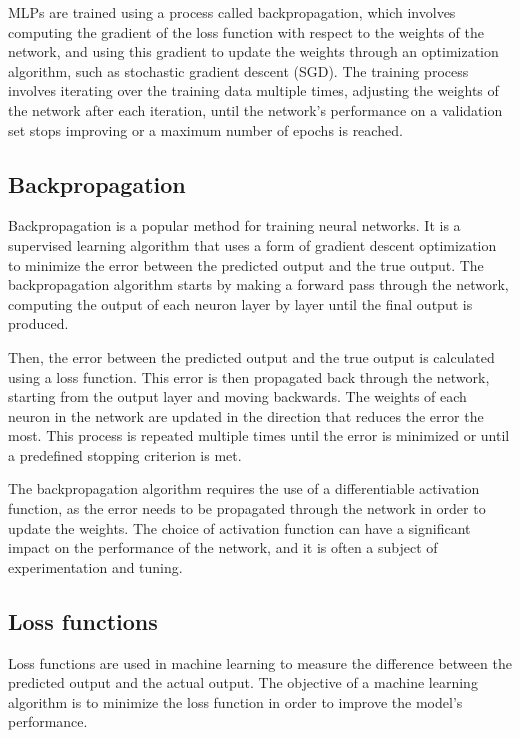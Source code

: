 MLPs are trained using a process called backpropagation, which involves computing the gradient of the loss function with respect to the weights of the network, and using this gradient to update the weights through an optimization algorithm, such as stochastic gradient descent (SGD). 
The training process involves iterating over the training data multiple times, adjusting the weights of the network after each iteration, until the network's performance on a validation set stops improving or a maximum number of epochs is reached.


\subsection{Backpropagation}

Backpropagation is a popular method for training neural networks.
It is a supervised learning algorithm that uses a form of gradient descent optimization to minimize the error between the predicted output and the true output.
The backpropagation algorithm starts by making a forward pass through the network, computing the output of each neuron layer by layer until the final output is produced.

Then, the error between the predicted output and the true output is calculated using a loss function.
This error is then propagated back through the network, starting from the output layer and moving backwards.
The weights of each neuron in the network are updated in the direction that reduces the error the most. 
This process is repeated multiple times until the error is minimized or until a predefined stopping criterion is met.

The backpropagation algorithm requires the use of a differentiable activation function, as the error needs to be propagated through the network in order to update the weights.
The choice of activation function can have a significant impact on the performance of the network, and it is often a subject of experimentation and tuning.

\subsection{Loss functions}

Loss functions are used in machine learning to measure the difference between the predicted output and the actual output. 
The objective of a machine learning algorithm is to minimize the loss function in order to improve the model's performance.

